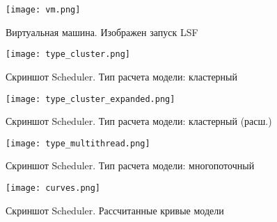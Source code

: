 \begin{figure}[h]
    \centering
    \texttt{[image: vm.png]}
    \caption{Виртуальная машина. Изображен запуск LSF}
\end{figure}

\begin{figure}[h]
    \centering
    \texttt{[image: type\_cluster.png]}
    \caption{Скриншот Scheduler. Тип расчета модели: кластерный}
\end{figure}

\begin{figure}[h]
    \centering
    \texttt{[image: type\_cluster\_expanded.png]}
    \caption{Скриншот Scheduler. Тип расчета модели: кластерный (расш.)}
\end{figure}

\begin{figure}[h]
    \centering
    \texttt{[image: type\_multithread.png]}
    \caption{Скриншот Scheduler. Тип расчета модели: многопоточный}
\end{figure}

\begin{figure}[h]
    \centering
    \texttt{[image: curves.png]}
    \caption{Скриншот Scheduler. Рассчитанные кривые модели}
\end{figure}

\clearpage